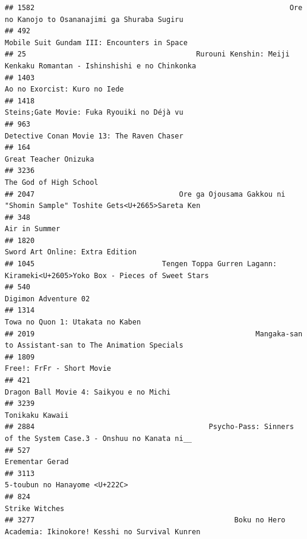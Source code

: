 \documentclass[
]{article}
\begin{document}
\begin{verbatim}
## 1582                                                            Ore no Kanojo to Osananajimi ga Shuraba Sugiru
## 492                                                                Mobile Suit Gundam III: Encounters in Space
## 25                                        Rurouni Kenshin: Meiji Kenkaku Romantan - Ishinshishi e no Chinkonka
## 1403                                                                              Ao no Exorcist: Kuro no Iede
## 1418                                                                Steins;Gate Movie: Fuka Ryouiki no Déjà vu
## 963                                                                 Detective Conan Movie 13: The Raven Chaser
## 164                                                                                      Great Teacher Onizuka
## 3236                                                                                    The God of High School
## 2047                                  Ore ga Ojousama Gakkou ni "Shomin Sample" Toshite Gets<U+2665>Sareta Ken
## 348                                                                                              Air in Summer
## 1820                                                                           Sword Art Online: Extra Edition
## 1045                              Tengen Toppa Gurren Lagann: Kirameki<U+2605>Yoko Box - Pieces of Sweet Stars
## 540                                                                                       Digimon Adventure 02
## 1314                                                                          Towa no Quon 1: Utakata no Kaben
## 2019                                                    Mangaka-san to Assistant-san to The Animation Specials
## 1809                                                                                 Free!: FrFr - Short Movie
## 421                                                                    Dragon Ball Movie 4: Saikyou e no Michi
## 3239                                                                                           Tonikaku Kawaii
## 2884                                         Psycho-Pass: Sinners of the System Case.3 - Onshuu no Kanata ni__
## 527                                                                                            Erementar Gerad
## 3113                                                                             5-toubun no Hanayome <U+222C>
## 824                                                                                             Strike Witches
## 3277                                               Boku no Hero Academia: Ikinokore! Kesshi no Survival Kunren

\end{verbatim}
\end{document}
